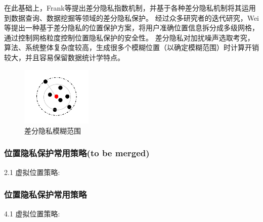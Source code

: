 \documentclass[zihao=-4]{ctexart}
\begin{document}
在此基础上，Frank等\cite{czh_6.7}提出差分隐私指数机制，并基于各种差分隐私机制将其运用到数据查询、数据挖掘等领域的差分隐私保护。
经过众多研究者的迭代研究，Wei等\cite{czh_6.8}提出一种基于差分隐私的位置保护方案，将用户准确位置信息拆分成多级网格，通过控制网格粒度控制位置隐私保护的安全性。
差分隐私对加扰噪声选取考究，算法、系统整体复杂度较高，生成很多个模糊位置（以确定模糊范围）时计算开销较大，并且容易保留数据统计学特点。
\begin{figure}[H] %
  \centering %
  \includegraphics[width=0.3\textwidth]{差分隐私.jpg} %
  \caption{差分隐私模糊范围} %
  \label{差分隐私} %
\end{figure}

\iffalse
\subsubsection{位置隐私保护常用策略(to be merged)}
2.1 虚拟位置策略: \par

\subsubsection{位置隐私保护常用策略}
4.1 虚拟位置策略: \par
\end{document}
